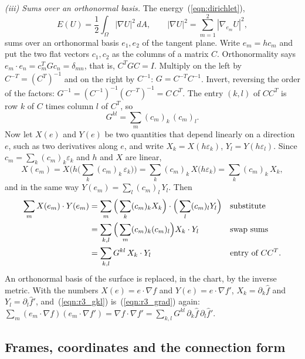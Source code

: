 \emph{(iii) Sums over an orthonormal basis.} The energy~(\ref{eqn:dirichlet}),
\begin{equation*}
E(U) = \frac12 \int_\Omega |\nabla U|^2\, dA, \qquad |\nabla U|^2 = \sum_{m=1}^2 |\nabla_{e_m} U|^2,
\end{equation*}
sums over an orthonormal basis $e_1, e_2$ of the tangent plane. Write $e_m = hc_m$ and put the two flat vectors $c_1, c_2$ as the columns of a matrix $C$. Orthonormality says $e_m\cdot e_n = c_m^T G c_n = \delta_{mn}$, that is, $C^T G C = I$. Multiply on the left by $C^{-T} = (C^T)^{-1}$ and on the right by $C^{-1}$: $G = C^{-T}C^{-1}$. Invert, reversing the order of the factors: $G^{-1} = (C^{-1})^{-1}(C^{-T})^{-1} = C\, C^T$. The entry $(k, l)$ of $CC^T$ is row $k$ of $C$ times column $l$ of $C^T$, so
\begin{equation*}
G^{kl} = \sum_m (c_m)_k\, (c_m)_l .
\end{equation*}
Now let $X(e)$ and $Y(e)$ be two quantities that depend linearly on a direction $e$, such as two derivatives along $e$, and write $X_k = X(h\varepsilon_k)$, $Y_l = Y(h\varepsilon_l)$. Since $c_m = \sum_k (c_m)_k\varepsilon_k$ and $h$ and $X$ are linear,
\begin{equation*}
X(e_m) = X\Big(h\Big(\sum_k (c_m)_k\,\varepsilon_k\Big)\Big) = \sum_k (c_m)_k\, X\big(h\varepsilon_k\big) = \sum_k (c_m)_k\, X_k ,
\end{equation*}
and in the same way $Y(e_m) = \sum_l (c_m)_l\, Y_l$. Then
\begin{align}
\sum_m X(e_m)\cdot Y(e_m) &= \sum_m \Big(\sum_k (c_m)_k X_k\Big)\cdot\Big(\sum_l (c_m)_l Y_l\Big) && \text{substitute} \notag \\
&= \sum_{k,l} \Big(\sum_m (c_m)_k (c_m)_l\Big) X_k\cdot Y_l && \text{swap sums} \notag \\
&= \sum_{k,l} G^{kl}\, X_k\cdot Y_l && \text{entry of } CC^T . \label{eqn:r3_gkl}
\end{align}
An orthonormal basis of the surface is replaced, in the chart, by the inverse metric. With the numbers $X(e) = e\cdot\nabla f$ and $Y(e) = e\cdot\nabla f'$, $X_k = \partial_k\hat f$ and $Y_l = \partial_l\hat f'$, and~(\ref{eqn:r3_gkl}) is~(\ref{eqn:r3_grad}) again: $\sum_m (e_m\cdot\nabla f)(e_m\cdot\nabla f') = \nabla f\cdot\nabla f' = \sum_{k,l} G^{kl}\,\partial_k\hat f\,\partial_l\hat f'$.

\subsection{Frames, coordinates and the connection form}
\label{section:r3_rotation}

